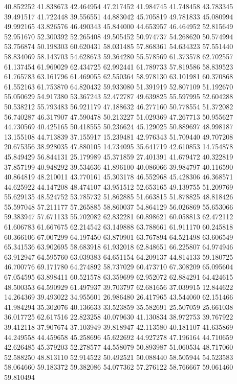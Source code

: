 40.852252
41.838673
42.464954
47.217452
41.984745
41.748458
43.783345
39.491517
41.722448
39.556551
44.883042
45.705819
49.781833
45.080994
49.992165
43.826576
46.490343
45.844000
44.653957
46.464952
52.815649
52.951670
52.300392
52.265408
49.505452
50.974737
54.268620
50.574994
53.756874
50.198303
60.620431
58.031485
57.868361
54.634323
57.551440
58.834069
58.143703
54.628673
59.364280
55.578569
61.373578
62.702557
61.137454
61.969029
62.434725
62.992441
61.789733
57.819586
58.839523
61.765783
63.161796
61.469055
62.550364
58.978130
63.101981
60.370868
61.552163
61.753870
64.820432
59.933080
51.391919
52.807109
51.192670
55.050629
54.917380
53.367243
52.472787
49.639825
55.597995
52.604288
50.538212
55.793483
56.921179
47.188632
46.277160
50.778554
51.372082
56.740287
46.317907
47.590478
50.213227
51.029369
47.267713
50.955627
44.730569
40.425165
50.418555
50.236624
45.129025
50.889697
48.998187
13.155108
44.713839
37.155917
15.239481
42.976343
51.709440
49.707208
20.675356
38.928035
47.880105
14.734095
35.641719
42.610853
14.754878
45.849429
56.844131
25.179989
45.371859
27.401391
41.679472
40.322819
37.857199
40.948292
39.534636
41.896100
40.086066
39.984797
40.116590
40.864819
48.210011
43.770161
45.303178
46.552968
45.428306
46.368571
44.625922
44.147208
48.474107
43.951512
52.653165
49.139755
51.209769
55.629135
48.524752
53.785732
51.862885
51.663815
51.878825
48.818426
55.597048
57.211177
57.265885
58.860037
54.864129
56.026869
55.653066
59.383947
57.671133
55.702082
62.832281
60.898621
60.058813
62.472112
61.606783
61.667675
62.214542
63.149888
63.788661
61.911170
60.245818
60.366106
67.007299
64.197450
63.870901
63.767894
64.521498
63.606549
65.341536
63.902695
58.683918
61.932018
62.848651
66.225807
64.974946
63.912947
64.595760
63.039383
64.651154
64.209137
44.814133
59.180725
46.700776
69.171780
64.274892
58.737029
60.473710
67.308209
65.095604
67.054595
63.898411
60.521578
63.359699
62.952072
62.884291
64.424615
48.500353
64.590929
61.497937
39.703797
62.681656
37.039915
12.844622
14.264369
39.493022
34.955601
26.986480
26.417965
43.544060
62.151466
41.984294
35.302076
40.136633
33.523859
35.582691
25.507059
25.661038
36.017725
62.617516
22.823258
40.079630
41.130834
38.972753
39.767922
39.412118
37.907674
37.103949
39.818947
42.113580
40.181107
41.635869
44.249558
44.459658
45.258696
45.622692
44.927278
47.196164
44.710659
42.626485
45.379203
52.278577
44.558079
50.893987
51.060534
48.717060
52.588250
48.813110
52.914522
50.492521
50.088440
58.505944
54.523583
58.064660
59.183372
59.382086
54.077362
57.276122
58.766667
59.061460
59.810494
